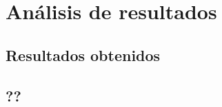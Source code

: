 \chapter{An\'alisis de resultados}

\label{Chapter4}

\section{Resultados obtenidos}

\lipsum[1]

\section{??}

\lipsum[1]